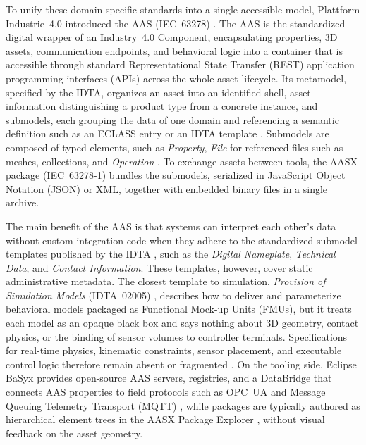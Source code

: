 \documentclass{ieeeojies}
\begin{document}
To unify these domain-specific standards into a single accessible model, Plattform Industrie~4.0 introduced the AAS (IEC~63278) \cite{Abdel-Aty2022,Pajpach2025}. The AAS is the standardized digital wrapper of an Industry~4.0 Component, encapsulating properties, 3D assets, communication endpoints, and behavioral logic into a container that is accessible through standard Representational State Transfer (REST) application programming interfaces (APIs) across the whole asset lifecycle. Its metamodel, specified by the IDTA, organizes an asset into an identified shell, asset information distinguishing a product type from a concrete instance, and submodels, each grouping the data of one domain and referencing a semantic definition such as an ECLASS entry or an IDTA template \cite{Pajpach2025,Reichardt2024}. Submodels are composed of typed elements, such as \textit{Property}, \textit{File} for referenced files such as meshes, collections, and \textit{Operation} \cite{Reichardt2024,Barnard2024}. To exchange assets between tools, the AASX package (IEC~63278-1) bundles the submodels, serialized in JavaScript Object Notation (JSON) or XML, together with embedded binary files in a single archive.

The main benefit of the AAS is that systems can interpret each other's data without custom integration code when they adhere to the standardized submodel templates published by the IDTA \cite{Abdel-Aty2022,Ahvanouee2025}, such as the \textit{Digital Nameplate}, \textit{Technical Data}, and \textit{Contact Information}. These templates, however, cover static administrative metadata. The closest template to simulation, \textit{Provision of Simulation Models} (IDTA~02005) \cite{IDTA02005}, describes how to deliver and parameterize behavioral models packaged as Functional Mock-up Units (FMUs), but it treats each model as an opaque black box and says nothing about 3D geometry, contact physics, or the binding of sensor volumes to controller terminals. Specifications for real-time physics, kinematic constraints, sensor placement, and executable control logic therefore remain absent or fragmented \cite{Pajpach2025,Perez2025}. On the tooling side, Eclipse BaSyx provides open-source AAS servers, registries, and a DataBridge that connects AAS properties to field protocols such as OPC~UA and Message Queuing Telemetry Transport (MQTT) \cite{Perez2025}, while packages are typically authored as hierarchical element trees in the AASX Package Explorer \cite{Pajpach2025}, without visual feedback on the asset geometry.
\end{document}
